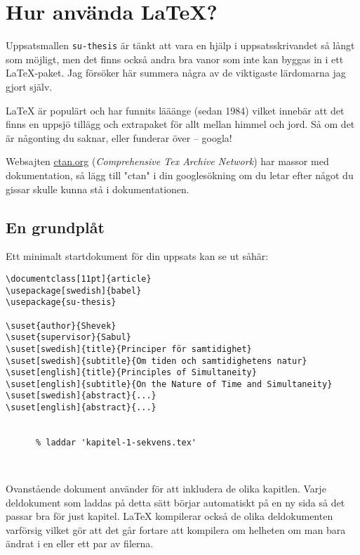 
\section{Hur använda \LaTeX{}?}
\label{hur}

Uppsatsmallen \texttt{su-thesis} är tänkt att vara en hjälp i uppsatsskrivandet
så långt som möjligt, men det finns också andra bra vanor som inte kan byggas
in i ett \LaTeX{}-paket. Jag försöker här summera några av de viktigaste
lärdomarna jag gjort själv.

\LaTeX{} är populärt och har funnits lääänge (sedan 1984) vilket innebär att
det finns en uppsjö tillägg och extrapaket för allt mellan himmel och jord. Så
om det är någonting du saknar, eller funderar över -- googla!

Websajten \href{https://ctan.org/}{\url{ctan.org}} (\emph{Comprehensive Tex
  Archive Network}) har massor med dokumentation, så lägg till "ctan" i din
googlesökning om du letar efter något du gissar skulle kunna stå i
dokumentationen.


\subsection{En grundplåt}
\label{grundplåt}

Ett minimalt startdokument för din uppsats kan se ut såhär:

\begin{verbatim}
\documentclass[11pt]{article}
\usepackage[swedish]{babel}
\usepackage{su-thesis}

\suset{author}{Shevek}
\suset{supervisor}{Sabul}
\suset[swedish]{title}{Principer för samtidighet}
\suset[swedish]{subtitle}{Om tiden och samtidighetens natur}
\suset[english]{title}{Principles of Simultaneity}
\suset[english]{subtitle}{On the Nature of Time and Simultaneity}
\suset[swedish]{abstract}{...}
\suset[english]{abstract}{...}


      % laddar 'kapitel-1-sekvens.tex'



\end{verbatim}

Ovanstående dokument använder  för att inkludera de olika
kapitlen. Varje deldokument som laddas på detta sätt börjar automatiskt på en
ny sida så det passar bra för just kapitel. \LaTeX{} kompilerar också de olika
deldokumenten varförsig vilket gör att det går fortare att kompilera om
helheten om man bara ändrat i en eller ett par av filerna.

